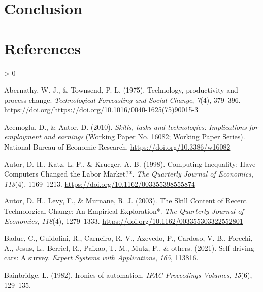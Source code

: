 \documentclass[
  english,
  man]{apa7}
\newlength{\cslhangindent}
\newenvironment{CSLReferences}[2] %
 {%
  \setlength{\parindent}{0pt}
  \ifodd #1 \everypar{\setlength{\hangindent}{\cslhangindent}}\ignorespaces\fi
  \ifnum #2 > 0
  \setlength{\parskip}{#2\baselineskip}
  \fi
 }%
 {}
\begin{document}
\hypertarget{conclusion}{%
\section{Conclusion}\label{conclusion}}

\newpage

\hypertarget{references}{%
\section{References}\label{references}}

\begingroup
\setlength{\parindent}{-0.5in}
\setlength{\leftskip}{0.5in}

\hypertarget{refs}{}
\begin{CSLReferences}{1}{0}
\leavevmode\hypertarget{ref-ABERNATHY1975379}{}%
Abernathy, W. J., \& Townsend, P. L. (1975). Technology, productivity and process change. \emph{Technological Forecasting and Social Change}, \emph{7}(4), 379--396. https://doi.org/\url{https://doi.org/10.1016/0040-1625(75)90015-3}

\leavevmode\hypertarget{ref-NBERw16082}{}%
Acemoglu, D., \& Autor, D. (2010). \emph{Skills, tasks and technologies: Implications for employment and earnings} (Working Paper No. 16082; Working Paper Series). National Bureau of Economic Research. \url{https://doi.org/10.3386/w16082}

\leavevmode\hypertarget{ref-10.1162ux2f003355398555874}{}%
Autor, D. H., Katz, L. F., \& Krueger, A. B. (1998). {Computing Inequality: Have Computers Changed the Labor Market?*}. \emph{The Quarterly Journal of Economics}, \emph{113}(4), 1169--1213. \url{https://doi.org/10.1162/003355398555874}

\leavevmode\hypertarget{ref-10.1162ux2f003355303322552801}{}%
Autor, D. H., Levy, F., \& Murnane, R. J. (2003). {The Skill Content of Recent Technological Change: An Empirical Exploration*}. \emph{The Quarterly Journal of Economics}, \emph{118}(4), 1279--1333. \url{https://doi.org/10.1162/003355303322552801}

\leavevmode\hypertarget{ref-badue2021self}{}%
Badue, C., Guidolini, R., Carneiro, R. V., Azevedo, P., Cardoso, V. B., Forechi, A., Jesus, L., Berriel, R., Paixao, T. M., Mutz, F., \& others. (2021). Self-driving cars: A survey. \emph{Expert Systems with Applications}, \emph{165}, 113816.

\leavevmode\hypertarget{ref-bainbridge1982ironies}{}%
Bainbridge, L. (1982). Ironies of automation. \emph{IFAC Proceedings Volumes}, \emph{15}(6), 129--135.


\end{CSLReferences}
\end{document}
